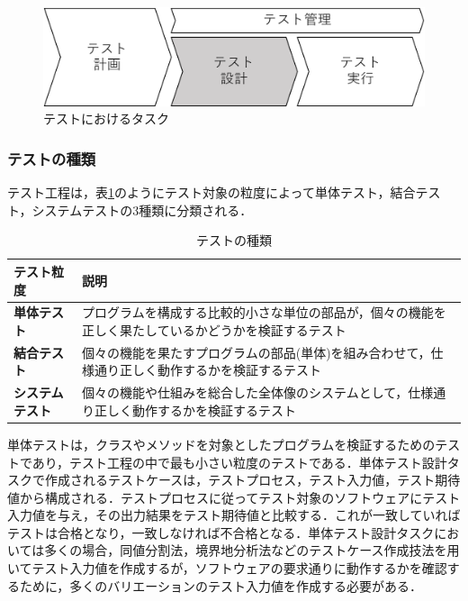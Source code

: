 \documentclass[12pt]{jarticle} %
\begin{document}
\begin{figure}[htbp]
\begin{center}
\includegraphics[clip,width=12cm]{image/test-task.pdf}
\caption{テストにおけるタスク}
\label{testtask}
\end{center}
\end{figure}

\subsubsection{テストの種類}

テスト工程は，表\ref{test-variety}のようにテスト対象の粒度によって単体テスト，結合テスト，システムテストの3種類に分類される．

\begin{table}[t]
\caption{テストの種類}
\label{test-variety}
\begin{tabular}{|l|p{11cm}|}
\hline
\textbf{テスト粒度} & \textbf{説明} \\ \hline
\textbf{単体テスト} & プログラムを構成する比較的小さな単位の部品が，個々の機能を正しく果たしているかどうかを検証するテスト \\ \hline
\textbf{結合テスト} & 個々の機能を果たすプログラムの部品(単体)を組み合わせて，仕様通り正しく動作するかを検証するテスト\\ \hline
\textbf{システムテスト} & 個々の機能や仕組みを総合した全体像のシステムとして，仕様通り正しく動作するかを検証するテスト \\ \hline
\end{tabular}
\end{table}

単体テストは，クラスやメソッドを対象としたプログラムを検証するためのテストであり，テスト工程の中で最も小さい粒度のテストである．単体テスト設計タスクで作成されるテストケースは，テストプロセス，テスト入力値，テスト期待値から構成される．テストプロセスに従ってテスト対象のソフトウェアにテスト入力値を与え，その出力結果をテスト期待値と比較する．これが一致していればテストは合格となり，一致しなければ不合格となる．単体テスト設計タスクにおいては多くの場合，同値分割法，境界地分析法などのテストケース作成技法を用いてテスト入力値を作成するが，ソフトウェアの要求通りに動作するかを確認するために，多くのバリエーションのテスト入力値を作成する必要がある．
\end{document}
